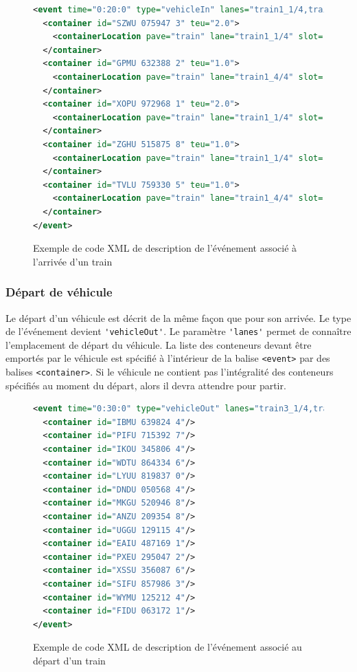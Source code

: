 \begin{figure}[ht]
\centering
 \begin{lstlisting}[language=XML]
<event time="0:20:0" type="vehicleIn" lanes="train1_1/4,train1_4/4">
  <container id="SZWU 075947 3" teu="2.0">
    <containerLocation pave="train" lane="train1_1/4" slot="train1_1/4-0" level="0" align="origin"/>
  </container>
  <container id="GPMU 632388 2" teu="1.0">
    <containerLocation pave="train" lane="train1_4/4" slot="train1_4/4-1" level="0" align="center"/>
  </container>
  <container id="XOPU 972968 1" teu="2.0">
    <containerLocation pave="train" lane="train1_1/4" slot="train1_1/4-2" level="0" align="center"/>
  </container>
  <container id="ZGHU 515875 8" teu="1.0">
    <containerLocation pave="train" lane="train1_1/4" slot="train1_1/4-3" level="0" align="center"/>
  </container>
  <container id="TVLU 759330 5" teu="1.0">
    <containerLocation pave="train" lane="train1_4/4" slot="train1_4/4-0" level="0" align="destination"/>
  </container>
</event>
\end{lstlisting}
\caption{Exemple de code XML de description de l'événement associé à l'arrivée d'un train}
\label{fig:simulation:evt:arriveVehicule}
\end{figure}

\subsubsection{Départ de véhicule}

Le départ d'un véhicule est décrit de la même façon que pour son arrivée. Le type de l'événement devient \verb!'vehicleOut'!. Le paramètre \verb!'lanes'! permet de connaître l'emplacement de départ du véhicule. La liste des conteneurs devant être emportés par le véhicule est spécifié à l'intérieur de la balise \verb!<event>! par des balises \verb!<container>!. Si le véhicule ne contient pas l'intégralité des conteneurs spécifiés au moment du départ, alors il devra attendre pour partir.

\begin{figure}[ht]
\centering
 \begin{lstlisting}[language=XML]
<event time="0:30:0" type="vehicleOut" lanes="train3_1/4,train3_4/4">
  <container id="IBMU 639824 4"/>
  <container id="PIFU 715392 7"/>
  <container id="IKOU 345806 4"/>
  <container id="WDTU 864334 6"/>
  <container id="LYUU 819837 0"/>
  <container id="DNDU 050568 4"/>
  <container id="MKGU 520946 8"/>
  <container id="ANZU 209354 8"/>
  <container id="UGGU 129115 4"/>
  <container id="EAIU 487169 1"/>
  <container id="PXEU 295047 2"/>
  <container id="XSSU 356087 6"/>
  <container id="SIFU 857986 3"/>
  <container id="WYMU 125212 4"/>
  <container id="FIDU 063172 1"/>
</event>
\end{lstlisting}
\caption{Exemple de code XML de description de l'événement associé au départ d'un train}
\label{fig:simulation:evt:departVehicule}
\end{figure}

